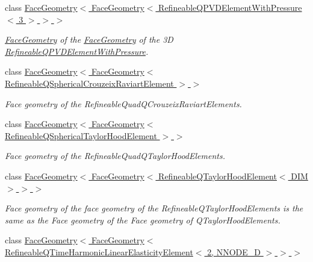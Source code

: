 \begin{DoxyCompactItemize}
class \hyperlink{classoomph_1_1FaceGeometry_3_01FaceGeometry_3_01RefineableQPVDElementWithPressure_3_013_01_4_01_4_01_4}{Face\+Geometry$<$ Face\+Geometry$<$ Refineable\+Q\+P\+V\+D\+Element\+With\+Pressure$<$ 3 $>$ $>$ $>$}
\begin{DoxyCompactList}\small\item\em \hyperlink{classoomph_1_1FaceGeometry}{Face\+Geometry} of the \hyperlink{classoomph_1_1FaceGeometry}{Face\+Geometry} of the 3D \hyperlink{classoomph_1_1RefineableQPVDElementWithPressure}{Refineable\+Q\+P\+V\+D\+Element\+With\+Pressure}. \end{DoxyCompactList}\item 
class \hyperlink{classoomph_1_1FaceGeometry_3_01FaceGeometry_3_01RefineableQSphericalCrouzeixRaviartElement_01_4_01_4}{Face\+Geometry$<$ Face\+Geometry$<$ Refineable\+Q\+Spherical\+Crouzeix\+Raviart\+Element $>$ $>$}
\begin{DoxyCompactList}\small\item\em Face geometry of the Refineable\+Quad\+Q\+Crouzeix\+Raviart\+Elements. \end{DoxyCompactList}\item 
class \hyperlink{classoomph_1_1FaceGeometry_3_01FaceGeometry_3_01RefineableQSphericalTaylorHoodElement_01_4_01_4}{Face\+Geometry$<$ Face\+Geometry$<$ Refineable\+Q\+Spherical\+Taylor\+Hood\+Element $>$ $>$}
\begin{DoxyCompactList}\small\item\em Face geometry of the Refineable\+Quad\+Q\+Taylor\+Hood\+Elements. \end{DoxyCompactList}\item 
class \hyperlink{classoomph_1_1FaceGeometry_3_01FaceGeometry_3_01RefineableQTaylorHoodElement_3_01DIM_01_4_01_4_01_4}{Face\+Geometry$<$ Face\+Geometry$<$ Refineable\+Q\+Taylor\+Hood\+Element$<$ D\+I\+M $>$ $>$ $>$}
\begin{DoxyCompactList}\small\item\em Face geometry of the face geometry of the Refineable\+Q\+Taylor\+Hood\+Elements is the same as the Face geometry of the Face geometry of Q\+Taylor\+Hood\+Elements. \end{DoxyCompactList}\item 
class \hyperlink{classoomph_1_1FaceGeometry_3_01FaceGeometry_3_01RefineableQTimeHarmonicLinearElasticityElement_30dd001f9853903c36c2fd45bbf5d07b1}{Face\+Geometry$<$ Face\+Geometry$<$ Refineable\+Q\+Time\+Harmonic\+Linear\+Elasticity\+Element$<$ 2, N\+N\+O\+D\+E\+\_\+D $>$ $>$ $>$}
\item 

\end{DoxyCompactItemize}
